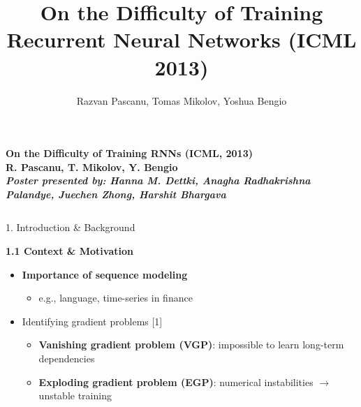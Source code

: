 \documentclass[final]{beamer}
\title{On the Difficulty of Training Recurrent Neural Networks (ICML 2013)}
\author{Razvan Pascanu, Tomas Mikolov, Yoshua Bengio}
\begin{document}
\begin{frame}[t]


\begin{center}
  \noindent
  \colorbox{nyuviolet}{\parbox{\textwidth}{\centering
    \color{white}
    \Huge\bfseries On the Difficulty of Training RNNs (ICML, 2013)\\[0.5em]
    \Large R. Pascanu, T. Mikolov, Y. Bengio\\[0.7em]
    \large \textit{Poster presented by: Hanna M. Dettki, Anagha Radhakrishna Palandye, Juechen Zhong, Harshit Bhargava}
  }}
\end{center}




  \begin{columns}[t,totalwidth=\textwidth]

    \hspace{0.05cm}
    \begin{column}{0.3\textwidth}
      \begin{block}{1. Introduction \& Background}

        \textbf{1.1 Context \& Motivation}
            \begin{itemize}
            \item \textbf{Importance of sequence modeling}
            \begin{itemize}
                \item e.g., language, time-series in finance
            \end{itemize}

            \item Identifying gradient problems [1]%
            \begin{itemize}
                \item \textbf{Vanishing gradient problem (VGP)}: impossible to learn long-term dependencies
                \item \textbf{Exploding gradient problem (EGP)}: numerical instabilities $\rightarrow$ unstable training
            \end{itemize}


\end{itemize}
\end{block}
\end{column}
\end{columns}
\end{frame}
\end{document}
